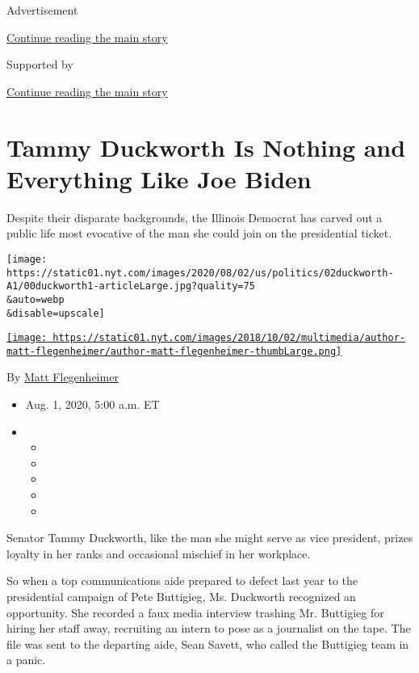 Advertisement

\protect\hyperlink{after-top}{Continue reading the main story}

Supported by

\protect\hyperlink{after-sponsor}{Continue reading the main story}

\hypertarget{tammy-duckworth-is-nothing-and-everything-like-joe-biden}{%
\section{Tammy Duckworth Is Nothing and Everything Like Joe
Biden}\label{tammy-duckworth-is-nothing-and-everything-like-joe-biden}}

Despite their disparate backgrounds, the Illinois Democrat has carved
out a public life most evocative of the man she could join on the
presidential ticket.

\texttt{[image: https://static01.nyt.com/images/2020/08/02/us/politics/02duckworth-A1/00duckworth1-articleLarge.jpg?quality=75\\\&auto=webp\\\&disable=upscale]}

\href{https://www.nytimes.com/by/matt-flegenheimer}{\texttt{[image: https://static01.nyt.com/images/2018/10/02/multimedia/author-matt-flegenheimer/author-matt-flegenheimer-thumbLarge.png]}}

By \href{https://www.nytimes.com/by/matt-flegenheimer}{Matt
Flegenheimer}

\begin{itemize}
\item
  Aug. 1, 2020, 5:00 a.m. ET
\item
  \begin{itemize}
  \item
  \item
  \item
  \item
  \item
  \end{itemize}
\end{itemize}

Senator Tammy Duckworth, like the man she might serve as vice president,
prizes loyalty in her ranks and occasional mischief in her workplace.

So when a top communications aide prepared to defect last year to the
presidential campaign of Pete Buttigieg, Ms. Duckworth recognized an
opportunity. She recorded a faux media interview trashing Mr. Buttigieg
for hiring her staff away, recruiting an intern to pose as a journalist
on the tape. The file was sent to the departing aide, Sean Savett, who
called the Buttigieg team in a panic.

